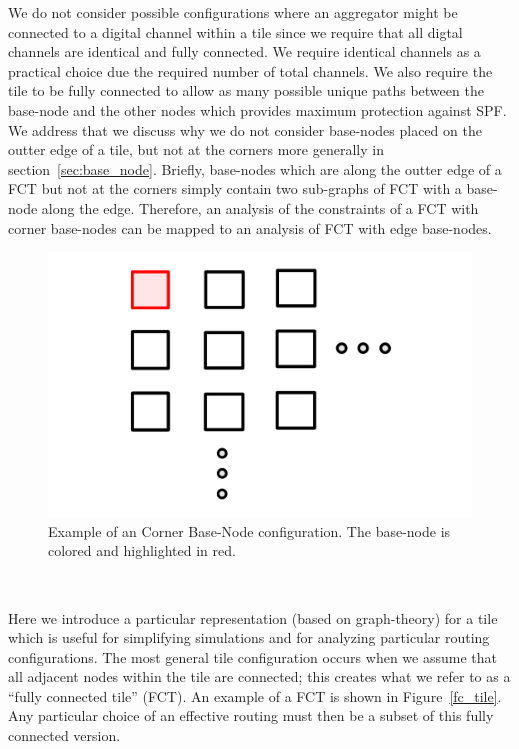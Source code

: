 We do not consider possible configurations where an aggregator might be connected to a digital channel within a tile since we require that all digtal channels are identical and fully connected.
We require identical channels as a practical choice due the required number of total channels.
We also require the tile to be fully connected to allow as many possible unique paths between the base-node and the other nodes which provides maximum protection against SPF.
We address that we discuss why we do not consider base-nodes placed on the outter edge of a tile, but not at the corners more generally in section~\ref{sec:base_node}.
Briefly, base-nodes which are along the outter edge of a FCT but not at the corners simply contain two sub-graphs of FCT with a base-node along the edge.
Therefore, an analysis of the constraints of a FCT with corner base-nodes can be mapped to an analysis of FCT with edge base-nodes.

\begin{figure}[]
\centering
\includegraphics[width=\textwidth]{images/CBN.pdf}
\caption{Example of an Corner Base-Node configuration. The base-node is colored and highlighted in red.}
\end{figure}~\label{fig:cbn}


Here we introduce a particular representation (based on graph-theory) for a tile which is useful for simplifying simulations and for analyzing particular routing configurations.
The most general tile configuration occurs when we assume that all adjacent nodes within the tile are connected; this creates what we refer to as a ``fully connected tile'' (FCT).
An example of a FCT is shown in Figure~\ref{fc_tile}.
Any particular choice of an effective routing must then be a subset of this fully connected version.

